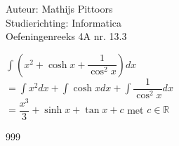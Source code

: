 \documentclass[a4paper]{article}
\newcommand{\intt}{\displaystyle\int}
\begin{document}
  
\noindent \large Auteur: Mathijs Pittoors \\
\noindent \large Studierichting: Informatica\\
\noindent \large Oefeningenreeks 4A nr. 13.3\\

\medskip

\normalsize

$\intt \left(x^2 + \cosh x + \dfrac{1}{\cos^2x}\right)dx$\\

$= \intt x^2 dx + \intt \cosh x dx + \intt \dfrac{1}{\cos^2x} dx$\\

$ = \dfrac{x^3}{3} + \sinh x + \tan x + c$  met  $c \in \mathbb{R}$

\begin{thebibliography}{999}
\end{thebibliography}
\end{document}
